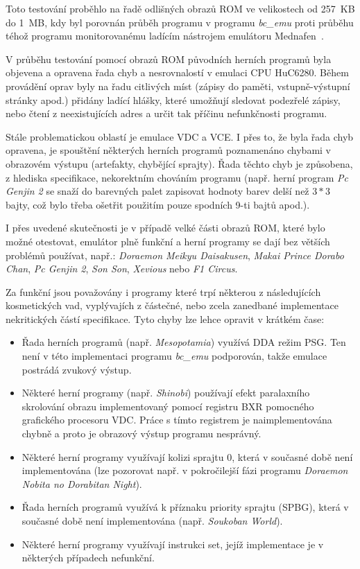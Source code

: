 Toto testování proběhlo na řadě odlišných obrazů ROM ve velikostech od 257~KB
do 1~MB, kdy byl porovnán průběh programu v programu {\em bc\_emu} proti
průběhu téhož programu monitorovanému ladícím nástrojem emulátoru
Mednafen~\cite{wwwMednafen}.

V průběhu testování pomocí obrazů ROM původních herních programů byla objevena
a opravena řada chyb a nesrovnalostí v emulaci CPU HuC6280. Během provádění
oprav byly na řadu citlivých míst (zápisy do paměti, vstupně-výstupní stránky
apod.) přidány ladící hlášky, které umožňují sledovat podezřelé zápisy, nebo
čtení z neexistujících adres a určit tak příčinu nefunkčnosti programu.

Stále problematickou oblastí je emulace VDC a VCE. I přes to, že byla řada chyb
opravena, je spouštění některých herních programů poznamenáno chybami v
obrazovém výstupu (artefakty, chybějící sprajty). Řada těchto chyb je
způsobena, z hlediska specifikace, nekorektním chováním programu (např. herní
program {\em Pc Genjin 2} se snaží do barevných palet zapisovat hodnoty barev
delší než $3 * 3$ bajty, což bylo třeba ošetřit použitím pouze spodních 9-ti
bajtů apod.).

I přes uvedené skutečnosti je v případě velké části obrazů ROM, které bylo
možné otestovat, emulátor plně funkční a herní programy se dají bez větších
problémů používat, např.:
{\em Doraemon Meikyu Daisakusen}, {\em Makai Prince Dorabo Chan}, {\em Pc
Genjin 2}, {\em Son Son}, {\em Xevious} nebo {\em F1 Circus}.

Za funkční jsou považovány i programy které trpí některou z
následujících kosmetických vad, vyplývajích z částečné, nebo zcela zanedbané
implementace nekritických částí specifikace. Tyto chyby lze lehce opravit v
krátkém čase:

\begin{itemize}
\item Řada herních programů (např. {\em Mesopotamia}) využívá DDA režim PSG.
	Ten není v této implementaci programu {\em bc\_emu} podporován, takže
	emulace postrádá zvukový výstup.

\item Některé herní programy (např. {\em Shinobi}) používají efekt paralaxního
	skrolování obrazu implementovaný pomocí registru {\sf BXR} pomocného
	grafického procesoru VDC. Práce s tímto registrem je naimplementována
	chybně a proto je obrazový výstup programu nesprávný.

\item Některé herní programy využívají kolizi sprajtu 0, která v současné době
	není implementována (lze pozorovat např. v pokročilejší fázi programu {\em
	Doraemon Nobita no Dorabitan Night}).

\item Řada herních programů využívá k příznaku priority sprajtu (SPBG), která v
	současné době není implementována (např. {\em Soukoban World}).

\item Některé herní programy využívají instrukci {\sc set}, jejíž implementace
	je v některých případech nefunkční.
\end{itemize}

